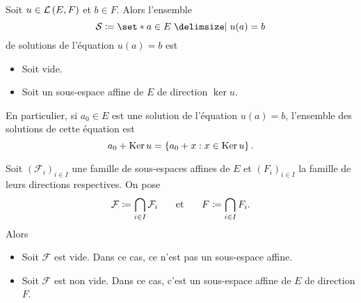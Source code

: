 \documentclass{magnolia}
\begin{document}
\begin{proposition}
Soit $u\in\mathcal{L}\left(E,F\right)$ et $b\in F$. Alors l'ensemble
\[\mathcal{S}\defeq\enstq{a\in E}{u(a)=b}\]
de solutions de l'équation $u(a)=b$ est
\begin{itemize}
\item Soit vide. 
\item Soit un sous-espace affine de $E$ de direction $\ker u$.
\end{itemize}
\end{proposition}

\begin{remarqueUnique}
\remarque En particulier, si $a_0\in E$ est une solution de l'équation $u(a)=b$, l'ensemble
  des solutions de cette équation est
  \[a_0 + \mathop{\rm Ker} u = \left\{a_0+x : x\in\mathop{\rm Ker} u\right\}.\]
\end{remarqueUnique}

\begin{proposition}
Soit $(\mathcal{F}_i)_{i\in I}$ une famille de sous-espaces affines de $E$ et
$(F_i)_{i\in I}$ la famille de leurs directions respectives. On pose
\[\mathcal{F}\coloneqq\bigcap_{i\in I} \mathcal{F}_i \quad\quad\!\text{et}\quad\!\quad F\coloneqq\bigcap_{i\in I} F_i.\]
Alors
\begin{itemize}
\item Soit $\mathcal{F}$ est vide. Dans ce cas, ce n'est pas un sous-espace affine.
\item Soit $\mathcal{F}$ est non vide. Dans ce cas, c'est un sous-espace affine de
  $E$ de direction $F$.
\end{itemize}
\end{proposition}



  
\end{document}
